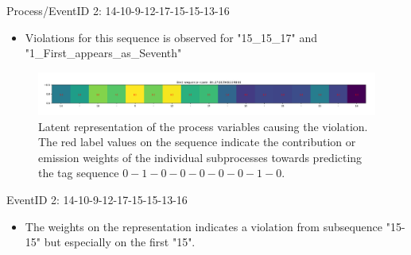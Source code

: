 \documentclass{beamer}
\begin{document}
\begin{frame} %
\begin{block}{Process/EventID 2: 14-10-9-12-17-15-15-13-16}
		\begin{itemize}
                \scriptsize
				\item Violations for this sequence is observed for "15\_15\_17" and "1\_First\_appears\_as\_Seventh"
			\end{itemize}
\end{block}
\begin{figure}[!h]
            \includegraphics[scale = .23]{item_two.png}
            \centering
            \caption{\scriptsize Latent representation of the process variables causing the violation.  The red label values on the sequence indicate the contribution or emission weights of the individual subprocesses towards predicting the tag sequence $0-1-0-0-0-0-0-1-0$.}
            \label{fig2}
\end{figure}
\begin{block}{EventID 2: 14-10-9-12-17-15-15-13-16}
		\begin{itemize}
            \scriptsize
			\item The weights on the representation indicates a violation from subsequence "15-15" but especially on the first "15".
			\end{itemize}
\end{block}
\end{frame}
\end{document}
